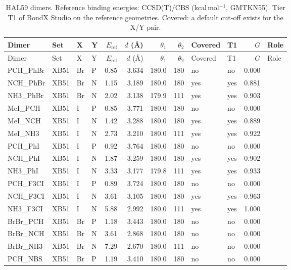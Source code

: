 \documentclass[journal=jcisd8,manuscript=suppinfo]{achemso}
\newcommand{\BX}{BondX Studio}
\begin{document}
\begin{singlespace}
{\scriptsize
\setlength{\tabcolsep}{3pt}
\begin{longtable}{llllrrrrllrl}
\caption{HAL59 dimers. Reference binding energies: CCSD(T)/CBS (kcal\,mol$^{-1}$, GMTKN55). Tier T1 of \BX{} on the reference geometries. Covered: a default cut-off exists for the X/Y pair.}\label{tab:hal59}\\
\toprule
Dimer & Set & X & Y & $E_\mathrm{ref}$ & $d$ (\AA) & $\theta_1$ & $\theta_2$ & Covered & T1 & $G$ & Role\\
\midrule
\endfirsthead
\toprule
Dimer & Set & X & Y & $E_\mathrm{ref}$ & $d$ (\AA) & $\theta_1$ & $\theta_2$ & Covered & T1 & $G$ & Role\\
\midrule
\endhead
\bottomrule
\endlastfoot
PCH\_PhBr & XB51 & Br & P & 0.85 & 3.634 & 180.0 & 180 & no & no & 0.000 & \\
NCH\_PhBr & XB51 & Br & N & 1.15 & 3.189 & 180.0 & 180 & yes & yes & 0.881 & \\
NH3\_PhBr & XB51 & Br & N & 2.02 & 3.138 & 179.9 & 111 & yes & yes & 0.903 & \\
MeI\_PCH & XB51 & I & P & 0.85 & 3.771 & 180.0 & 180 & no & no & 0.000 & \\
MeI\_NCH & XB51 & I & N & 1.42 & 3.288 & 180.0 & 180 & yes & yes & 0.889 & \\
MeI\_NH3 & XB51 & I & N & 2.73 & 3.210 & 180.0 & 111 & yes & yes & 0.922 & \\
PCH\_PhI & XB51 & I & P & 0.92 & 3.764 & 180.0 & 180 & no & no & 0.000 & \\
NCH\_PhI & XB51 & I & N & 1.87 & 3.259 & 180.0 & 180 & yes & yes & 0.902 & \\
NH3\_PhI & XB51 & I & N & 3.33 & 3.177 & 179.8 & 111 & yes & yes & 0.933 & \\
PCH\_F3CI & XB51 & I & P & 0.89 & 3.724 & 180.0 & 180 & no & no & 0.000 & \\
NCH\_F3CI & XB51 & I & N & 3.61 & 3.105 & 180.0 & 180 & yes & yes & 0.963 & \\
NH3\_F3CI & XB51 & I & N & 5.88 & 2.992 & 180.0 & 111 & yes & yes & 1.000 & \\
BrBr\_PCH & XB51 & Br & P & 1.18 & 3.443 & 180.0 & 180 & no & no & 0.000 & \\
BrBr\_NCH & XB51 & Br & N & 3.61 & 2.868 & 180.0 & 180 & no & no & 0.000 & \\
BrBr\_NH3 & XB51 & Br & N & 7.29 & 2.670 & 180.0 & 111 & no & no & 0.000 & \\
PCH\_NBS & XB51 & Br & P & 1.19 & 3.410 & 180.0 & 180 & no & no & 0.000 & \\

\end{longtable}}
\end{singlespace}
\end{document}
